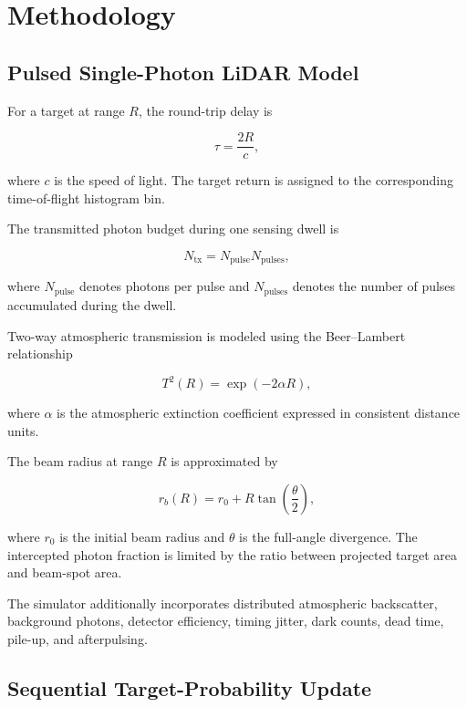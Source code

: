 \section{Methodology}

\subsection{Pulsed Single-Photon LiDAR Model}

For a target at range $R$, the round-trip delay is

\begin{equation}
\tau = \frac{2R}{c},
\end{equation}

where $c$ is the speed of light. The target return is assigned to the corresponding time-of-flight histogram bin.

The transmitted photon budget during one sensing dwell is

\begin{equation}
N_{\mathrm{tx}} = N_{\mathrm{pulse}} N_{\mathrm{pulses}},
\end{equation}

where $N_{\mathrm{pulse}}$ denotes photons per pulse and $N_{\mathrm{pulses}}$ denotes the number of pulses accumulated during the dwell.

Two-way atmospheric transmission is modeled using the Beer--Lambert relationship

\begin{equation}
T^2(R) =
\exp\left(-2\alpha R\right),
\end{equation}

where $\alpha$ is the atmospheric extinction coefficient expressed in consistent distance units.

The beam radius at range $R$ is approximated by

\begin{equation}
r_b(R) =
r_0 + R\tan\left(\frac{\theta}{2}\right),
\end{equation}

where $r_0$ is the initial beam radius and $\theta$ is the full-angle divergence. The intercepted photon fraction is limited by the ratio between projected target area and beam-spot area.

The simulator additionally incorporates distributed atmospheric backscatter, background photons, detector efficiency, timing jitter, dark counts, dead time, pile-up, and afterpulsing.

\subsection{Sequential Target-Probability Update}


